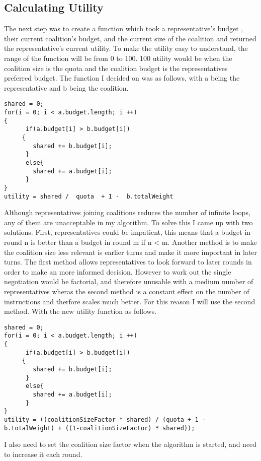 \subsection{Calculating Utility}
The next step was to create a function which took a representative’s budget , their current coalition’s budget, and the current size of the coalition and returned the representative’s current utility. To make the utility easy to understand, the range of the function will be from 0 to 100. 100 utility would be when the coalition size is the quota and the coalition budget is the representatives preferred budget. The function I decided on was as follows, with a being the representative and b being the coalition.
\begin{lstlisting}
shared = 0;
for(i = 0; i < a.budget.length; i ++)
{
      if(a.budget[i] > b.budget[i])
     {
        shared += b.budget[i];
      }
      else{
        shared += a.budget[i];
      }
}
utility = shared /  quota  + 1 -  b.totalWeight
\end{lstlisting}
Although representatives joining coalitions reduces the number of infinite loops, any of them are unacceptable in my algorithm. To solve this I came up with two solutions. First, representatives could be impatient, this means that a budget in round n is better than a budget in round m if n < m. Another method is to make the coalition size less relevant is earlier turns and make it more important in later turns. The first method allows representatives to look forward to later rounds in order to make an more informed decision. However to work out the single negotiation would be factorial, and therefore unusable with a medium number of representatives wheras the second method is a constant effect on the number of instructions and therfore scales much better. For this reason I will use the second method. With the new utility function as follows.  
\begin{lstlisting}
shared = 0;
for(i = 0; i < a.budget.length; i ++)
{
      if(a.budget[i] > b.budget[i])
     {
        shared += b.budget[i];
      }
      else{
        shared += a.budget[i];
      }
}
utility = ((coalitionSizeFactor * shared) / (quota + 1 - b.totalWeight) + ((1-coalitionSizeFactor) * shared));
\end{lstlisting}
I also need to set the coalition size factor when the algorithm is started, and need to increase it each round.
